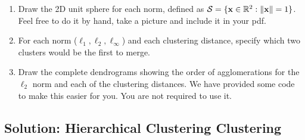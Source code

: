 \documentclass[submit]{harvardml}
\begin{document}
\begin{problem}
  \begin{enumerate}
  \item Draw the 2D unit sphere for each norm,
  defined as $\mathcal{S} = \{\mathbf{x} \in \mathbb{R}^2: \|\mathbf{x}\| = 1 \}$. Feel free to do
  it by hand, take a picture and include it in your pdf.
\item  For each norm ($\ell_1, \ell_2, \ell_\infty$) and each clustering distance, specify which two clusters would
  be the first to merge.
\item Draw the complete dendrograms showing the order of agglomerations for the $\ell_2$ norm and each of the clustering distances. We have provided some code to make this easier for you. You are not required to use it.
  \end{enumerate}


\end{problem}

\newpage 
\subsection*{Solution: Hierarchical Clustering Clustering}
\end{document}
